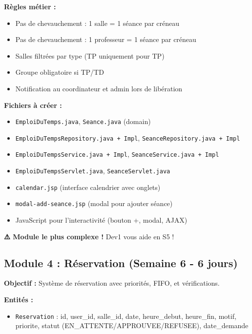 \documentclass[11pt,a4paper]{article}
\begin{document}
\textbf{Règles métier :}
\begin{itemize}
    \item Pas de chevauchement : 1 salle = 1 séance par créneau
    \item Pas de chevauchement : 1 professeur = 1 séance par créneau
    \item Salles filtrées par type (TP uniquement pour TP)
    \item Groupe obligatoire si TP/TD
    \item Notification au coordinateur et admin lors de libération
\end{itemize}

\textbf{Fichiers à créer :}
\begin{itemize}
    \item \texttt{EmploiDuTemps.java}, \texttt{Seance.java} (domain)
    \item \texttt{EmploiDuTempsRepository.java + Impl}, \texttt{SeanceRepository.java + Impl}
    \item \texttt{EmploiDuTempsService.java + Impl}, \texttt{SeanceService.java + Impl}
    \item \texttt{EmploiDuTempsServlet.java}, \texttt{SeanceServlet.java}
    \item \texttt{calendar.jsp} (interface calendrier avec onglets)
    \item \texttt{modal-add-seance.jsp} (modal pour ajouter séance)
    \item JavaScript pour l'interactivité (bouton +, modal, AJAX)
\end{itemize}

\textbf{⚠️ Module le plus complexe !} Dev1 vous aide en S5 !

\subsection{Module 4 : Réservation (Semaine 6 - 6 jours)}

\textbf{Objectif :} Système de réservation avec priorités, FIFO, et vérifications.

\textbf{Entités :}
\begin{itemize}
    \item \texttt{Reservation} : id, user\_id, salle\_id, date, heure\_debut, heure\_fin, motif, priorite, statut (EN\_ATTENTE/APPROUVEE/REFUSEE), date\_demande
\end{itemize}
\end{document}

